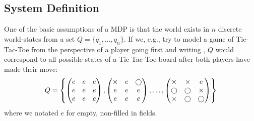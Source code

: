 \documentclass{article}
\theoremstyle{definition}
\def\ticX{\text{${\times}$}}
\def\ticO{\text{\small{\textcircled{ }}}}
\begin{document}
\subsection{System Definition}
One of the basic assumptions of a MDP is that the world exists in $n$ discrete world-states from a set $Q=\{q_1,\ldots,q_n\}$. If we, e.g., try to model a game of Tic-Tac-Toe from the perspective of a player going first and writing {\ticX},  $Q$ would correspond to all possible states of a Tic-Tac-Toe board after both players have made their move:
\[
Q=\left \{ \left (
\begin{matrix} 
e &e &e \\ 
e &e &e \\
e &e &e 
\end{matrix} \right ), 
\left ( 
\begin{matrix} 
{\ticX} &e &{\ticO} \\ 
e &e &e \\ 
e &e &e 
\end{matrix} \right ),\ldots,
\left ( 
\begin{matrix} 
{\ticX} & {\ticX} &e \\ 
{\ticO} & {\ticO} &{\ticX} \\ 
{\ticX} & {\ticO} &{\ticO} 
\end{matrix} \right ) \right \}
\] 
where we notated $e$ for empty, non-filled in fields. 
\end{document}
